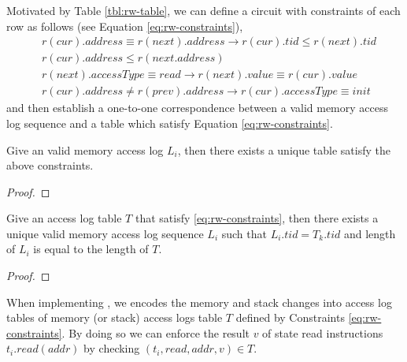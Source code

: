 \noindent Motivated by Table \ref{tbl:rw-table}, we can define a circuit with constraints of each row as follows (see Equation \ref{eq:rw-constraints}),
\begin{equation}
\label{eq:rw-constraints}
\begin{split}
    &r(cur).address \equiv r(next).address \rightarrow r(cur).tid \le r(next).tid \\
    &r(cur).address  \le r(next.address) \\
    &r(next).accessType \equiv read \rightarrow r(next).value \equiv r(cur).value \\
    &r(cur).address \neq r(prev).address \rightarrow r(cur).accessType \equiv init
\end{split}
\end{equation}
and then establish a one-to-one correspondence between a valid memory access log sequence and a table which satisfy Equation \ref{eq:rw-constraints}.
\begin{theorem}
\label{thm:one-one-rw-1}
Give an valid memory access log ${L_i}$, then there exists a unique table satisfy the above constraints.
\end{theorem}
\begin{proof}
\end{proof}
\begin{theorem}
\label{thm:one-one-rw-2}
Give an access log table $T$ that satisfy \ref{eq:rw-constraints}, then there exists a unique valid memory access log sequence $L_i$ such that $L_i.tid = T_k.tid$ and length of $L_i$ is equal to the length of $T$.
\end{theorem}
\begin{proof}
\end{proof}
When implementing \zkwasm, we encodes the memory and stack changes into access log tables of memory (or stack) access logs table $T$ defined by Constraints \ref{eq:rw-constraints}. By doing so we can enforce the result $v$ of state read instructions $t_i.read(addr)$ by checking $(t_i, read, addr, v) \in T$.

